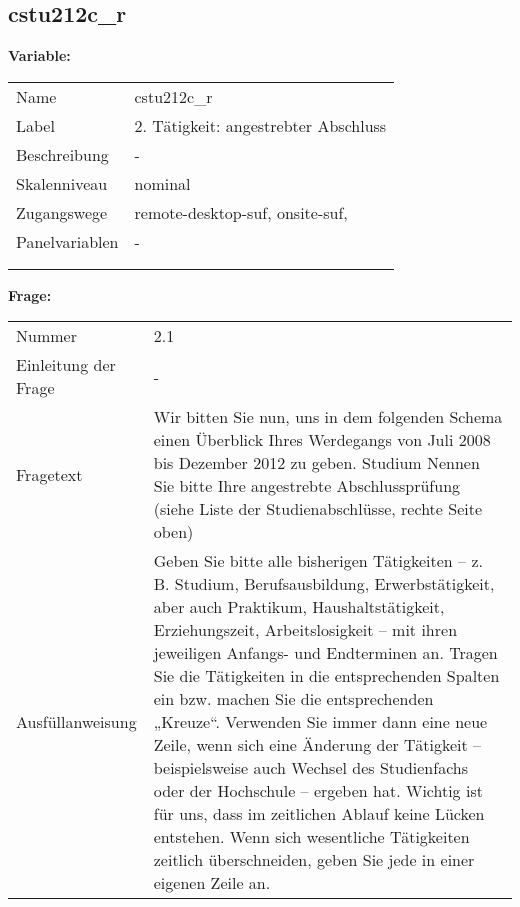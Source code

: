 	
	
	\subsection{cstu212c\_r}
	\label{subSection:cstu212c_r}

	\noindent\textbf{Variable:}\\
		\begin{tabular}{lL{11.3cm}}
			\label{tableVariable:cstu212c_r}
			Name & cstu212c\_r \\
			Label & 2. Tätigkeit: angestrebter Abschluss \\
			Beschreibung & - \\
			Skalenniveau & nominal \\
			Zugangswege &
				remote-desktop-suf,
				onsite-suf,
 \\
			Panelvariablen & -
			 \\
			 \\
 \\
		\end{tabular}

		\vspace*{1 cm}
		\noindent\textbf{Frage:}\\
		\begin{tabular}{lL{11.3cm}}
			\label{tableQuestion:cstu212c_r}
			Nummer & 2.1 \\
			Einleitung der Frage & - \\
			Fragetext & Wir bitten Sie nun, uns in dem folgenden Schema einen Überblick Ihres Werdegangs von Juli 2008 bis Dezember 2012 zu geben.
Studium
Nennen Sie bitte Ihre angestrebte Abschlussprüfung 
(siehe Liste der Studienabschlüsse, rechte Seite oben) \\
			Ausfüllanweisung & Geben Sie bitte alle bisherigen Tätigkeiten – z. B. Studium, Berufsausbildung, Erwerbstätigkeit, aber auch Praktikum, Haushaltstätigkeit,
Erziehungszeit, Arbeitslosigkeit – mit ihren jeweiligen Anfangs- und Endterminen an. Tragen Sie die Tätigkeiten in die entsprechenden Spalten ein bzw. machen Sie die entsprechenden „Kreuze“. Verwenden Sie immer dann eine neue Zeile, wenn sich eine Änderung der Tätigkeit – beispielsweise auch Wechsel des Studienfachs oder der Hochschule – ergeben hat. Wichtig ist für uns, dass im zeitlichen Ablauf keine Lücken entstehen. Wenn sich wesentliche Tätigkeiten zeitlich überschneiden, geben Sie jede in einer eigenen Zeile an. \\
		\end{tabular}





